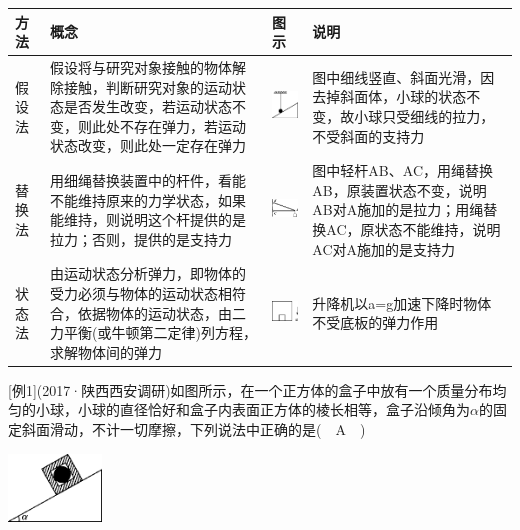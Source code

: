 \begin{longtable}[]{@{}m{0.2cm}m{6.1cm}m{2cm}m{5cm}@{}}
\toprule

方法& 概念& 图示&说明 \tabularnewline
\midrule
假
设
法& 假设将与研究对象接触的物体解除接触，判断研究对象的运动状态是否发生改变，若运动状态不变，则此处不存在弹力，若运动状态改变，则此处一定存在弹力  &
\begin{center}\includegraphics[width=0.55208in,height=0.55208in]{media/image40.png}\end{center}&
图中细线竖直、斜面光滑，因去掉斜面体，小球的状态不变，故小球只受细线的拉力，不受斜面的支持力\tabularnewline

替
换
法 & 用细绳替换装置中的杆件，看能不能维持原来的力学状态，如果能维持，则说明这个杆提供的是拉力；否则，提供的是支持力&
\begin{center}\includegraphics[width=0.82292in,height=0.58333in]{media/image41.png}\end{center}&
图中轻杆AB、AC，用绳替换AB，原装置状态不变，说明AB对A施加的是拉力；用绳替换AC，原状态不能维持，说明AC对A施加的是支持力\strut
\tabularnewline
状
态
法 & 由运动状态分析弹力，即物体的受力必须与物体的运动状态相符合，依据物体的运动状态，由二力平衡(或牛顿第二定律)列方程，求解物体间的弹力 &
\begin{center}\includegraphics[width=0.55208in,height=0.42708in]{media/image42.png}\end{center}&
升降机以a=g加速下降时物体不受底板的弹力作用\tabularnewline
\bottomrule
\end{longtable}

{[}例1{]}(2017·陕西西安调研)如图所示，在一个正方体的盒子中放有一个质量分布均匀的小球，小球的直径恰好和盒子内表面正方体的棱长相等，盒子沿倾角为$\alpha$的固定斜面滑动，不计一切摩擦，下列说法中正确的是(　A　)

\begin{center}\includegraphics[width=0.97917in,height=0.70833in]{media/image43.png}\end{center}


